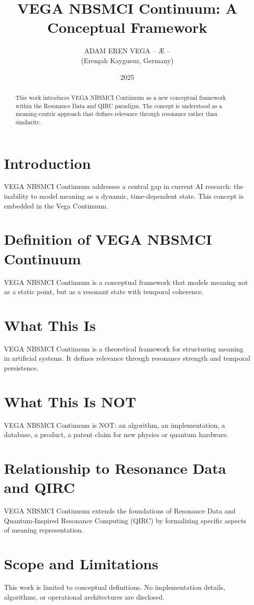 \documentclass[12pt,a4paper]{article}
\title{VEGA NBSMCI Continuum: A Conceptual Framework}
\author{ADAM EREN VEGA – Æ – \\ (Erenşah Kaygusuz, Germany)}
\date{2025}
\begin{document}
\maketitle

\begin{abstract}
This work introduces VEGA NBSMCI Continuum as a new conceptual framework within the Resonance Data and QIRC paradigm. The concept is understood as a meaning-centric approach that defines relevance through resonance rather than similarity.
\end{abstract}

\section{Introduction}
VEGA NBSMCI Continuum addresses a central gap in current AI research: the inability to model meaning as a dynamic, time-dependent state. This concept is embedded in the Vega Continuum.

\section{Definition of VEGA NBSMCI Continuum}
VEGA NBSMCI Continuum is a conceptual framework that models meaning not as a static point, but as a resonant state with temporal coherence.

\section{What This Is}
VEGA NBSMCI Continuum is a theoretical framework for structuring meaning in artificial systems. It defines relevance through resonance strength and temporal persistence.

\section{What This Is NOT}
VEGA NBSMCI Continuum is NOT: an algorithm, an implementation, a database, a product, a patent claim for new physics or quantum hardware.

\section{Relationship to Resonance Data and QIRC}
VEGA NBSMCI Continuum extends the foundations of Resonance Data and Quantum-Inspired Resonance Computing (QIRC) by formalizing specific aspects of meaning representation.

\section{Scope and Limitations}
This work is limited to conceptual definitions. No implementation details, algorithms, or operational architectures are disclosed.
\end{document}
